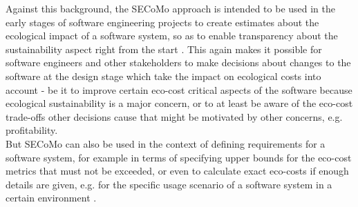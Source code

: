 \documentclass[oribibl]{llncs}
\begin{document}
Against this background, the SECoMo approach is intended to be used in the early stages of software engineering projects to create estimates about the ecological impact of a software system, so as to enable transparency about the sustainability aspect right from the start \cite{schulze_cost_2016}. This again makes it possible for software engineers and other stakeholders to make decisions about changes to the software at the design stage which take the impact on ecological costs into account %
- be it to improve certain eco-cost critical aspects of the software because ecological sustainability is a major concern, or to at least be aware of the eco-cost trade-offs other decisions cause that might be motivated by other concerns, e.g. profitability. \cite{schulze_cost_2016}\\ %
But SECoMo can also be used in the context of defining requirements for a software system, for example in terms of specifying upper bounds for the eco-cost metrics that must not be exceeded, or even to calculate exact eco-costs if enough details are given, e.g. for the specific usage scenario of a software system in a certain environment %
\cite{schulze_cost_2016}.\\
\end{document}
